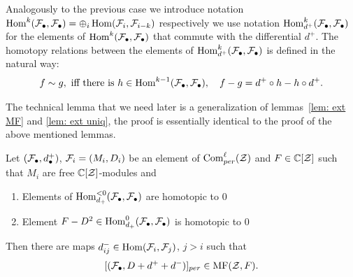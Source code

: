 Analogously to the previous case we introduce notation $\mathop{{\rm Hom}}\nolimits^k(\mathcal{F}_\bullet,\mathcal{F}_\bullet)=\oplus_i \mathop{{\rm Hom}}\nolimits(\mathcal{F}_i,\mathcal{F}_{i-k})$ respectively we use notation
$\mathop{{\rm Hom}}\nolimits^k_{d^+}(\mathcal{F}_\bullet,\mathcal{F}_\bullet)$ for the elements of $\mathop{{\rm Hom}}\nolimits^k(\mathcal{F}_\bullet,\mathcal{F}_\bullet)$ that commute with the differential $d^+$. The homotopy relations
between the elements of $\mathop{{\rm Hom}}\nolimits^k_{d^+}(\mathcal{F}_\bullet,\mathcal{F}_\bullet)$ is defined in the natural way:
$$ f\sim g,\mbox{ iff there is } h\in \mathop{{\rm Hom}}\nolimits^{k-1}(\mathcal{F}_\bullet,\mathcal{F}_\bullet), \quad f-g=d^+\circ h-h\circ d^+.$$





The technical lemma that we need later is a generalization of lemmas~\ref{lem: ext MF} and \ref{lem: ext uniq}, the proof is essentially identical to the proof of the above mentioned lemmas.
\begin{lemma}
  \label{lem: ext MF+} Let $(\mathcal{F}_\bullet,d_\bullet^+)$, $\mathcal{F}_i=(M_i,D_i)$ be an element of $\mathrm{Com}^\ell_{per}(\mathcal{Z})$ and $F\in \mathbb{C}[\mathcal{Z}]$ such that \( M_i\) are free \(\mathbb{C}[\mathcal{Z}]\)-modules
  and
\begin{enumerate}
\item Elements of $\mathop{{\rm Hom}}\nolimits_{d_+}^{<0}(\mathcal{F}_\bullet,\mathcal{F}_\bullet)$ are homotopic to $0$
\item Element $F-D^2\in \mathop{{\rm Hom}}\nolimits_{d_+}^{0}(\mathcal{F}_\bullet,\mathcal{F}_\bullet)$ is homotopic to $0$
\end{enumerate}
Then there are maps  $d_{ij}^-\in \mathop{{\rm Hom}}\nolimits( \mathcal{F}_i, \mathcal{F}_j)$, $j>i$ such that
$$ [(\mathcal{F}_\bullet, D+d^++d^-)]_{per}\in \mathrm{MF}(\mathcal{Z},F).$$
\end{lemma}
